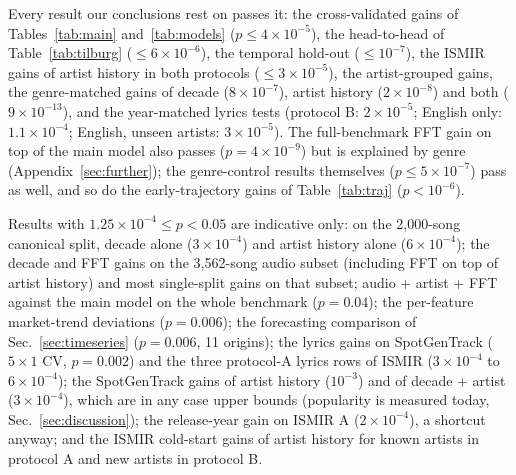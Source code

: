 Every result our conclusions rest on passes it: the cross-validated gains of Tables~\ref{tab:main}
and~\ref{tab:models} ($p\leq4\times10^{-5}$), the head-to-head of Table~\ref{tab:tilburg} ($\leq6\times10^{-6}$),
the temporal hold-out ($\leq10^{-7}$), the ISMIR gains of artist history in both protocols ($\leq3\times10^{-5}$),
the artist-grouped gains, the genre-matched gains of decade ($8\times10^{-7}$), artist history ($2\times10^{-8}$)
and both ($9\times10^{-13}$), and the year-matched lyrics tests (protocol B: $2\times10^{-5}$; English only:
$1.1\times10^{-4}$; English, unseen artists: $3\times10^{-5}$). The full-benchmark FFT gain on top of the main model
also passes ($p=4\times10^{-9}$) but is explained by genre (Appendix~\ref{sec:further}); the genre-control results
themselves ($p\leq5\times10^{-7}$) pass as well, and so do the early-trajectory gains of Table~\ref{tab:traj}
($p<10^{-6}$).

Results with $1.25\times10^{-4}\leq p<0.05$ are indicative only: on the 2{,}000-song canonical split, decade alone
($3\times10^{-4}$) and artist history alone ($6\times10^{-4}$); the decade and FFT gains on the 3{,}562-song audio
subset (including FFT on top of artist history) and most single-split gains on that subset; audio + artist + FFT
against the main model on the whole benchmark ($p=0.04$); the per-feature market-trend deviations ($p=0.006$); the
forecasting comparison of Sec.~\ref{sec:timeseries} ($p=0.006$, 11 origins); the lyrics gains on SpotGenTrack
($5{\times}1$ CV, $p=0.002$) and the three protocol-A lyrics rows of ISMIR ($3\times10^{-4}$ to $6\times10^{-4}$); the
SpotGenTrack gains of artist history ($10^{-3}$) and of decade + artist ($3\times10^{-4}$), which are in any case
upper bounds (popularity is measured today, Sec.~\ref{sec:discussion}); the release-year gain on ISMIR A
($2\times10^{-4}$), a shortcut anyway; and the ISMIR cold-start gains of artist history for known artists in
protocol A and new artists in protocol B.
